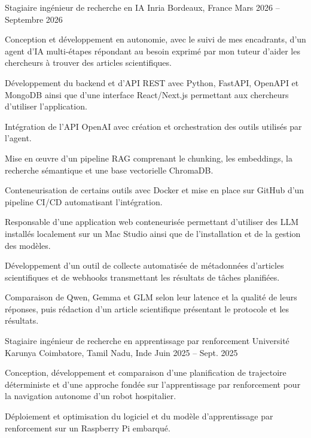 
\begin{cventries}
  \cventry
    {Stagiaire ingénieur de recherche en IA}
    {Inria}
    {Bordeaux, France}
    {Mars 2026 -- Septembre 2026}
    {
      \begin{cvitems}
        \item {Conception et développement en autonomie, avec le suivi de mes encadrants, d’un agent d’IA multi-étapes répondant au besoin exprimé par mon tuteur d’aider les chercheurs à trouver des articles scientifiques.}
        \item {Développement du backend et d’API REST avec Python, FastAPI, OpenAPI et MongoDB ainsi que d’une interface React/Next.js permettant aux chercheurs d’utiliser l’application.}
        \item {Intégration de l’API OpenAI avec création et orchestration des outils utilisés par l’agent.}
        \item {Mise en œuvre d’un pipeline RAG comprenant le chunking, les embeddings, la recherche sémantique et une base vectorielle ChromaDB.}
        \item {Conteneurisation de certains outils avec Docker et mise en place sur GitHub d’un pipeline CI/CD automatisant l’intégration.}
        \item {Responsable d’une application web conteneurisée permettant d’utiliser des LLM installés localement sur un Mac Studio ainsi que de l’installation et de la gestion des modèles.}
        \item {Développement d’un outil de collecte automatisée de métadonnées d’articles scientifiques et de webhooks transmettant les résultats de tâches planifiées.}
        \item {Comparaison de Qwen, Gemma et GLM selon leur latence et la qualité de leurs réponses, puis rédaction d’un article scientifique présentant le protocole et les résultats.}
      \end{cvitems}
    }

  \cventry
    {Stagiaire ingénieur de recherche en apprentissage par renforcement}
    {Université Karunya}
    {Coimbatore, Tamil Nadu, Inde}
    {Juin 2025 -- Sept. 2025}
    {
      \begin{cvitems}
        \item {Conception, développement et comparaison d’une planification de trajectoire déterministe et d’une approche fondée sur l’apprentissage par renforcement pour la navigation autonome d’un robot hospitalier.}
        \item {Déploiement et optimisation du logiciel et du modèle d’apprentissage par renforcement sur un Raspberry Pi embarqué.}
      \end{cvitems}
    }
\end{cventries}
